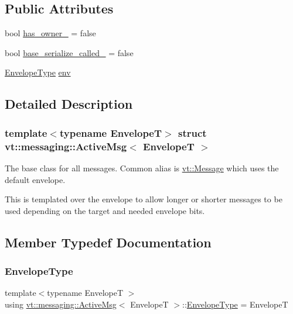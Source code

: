 \subsection*{Public Attributes}
\begin{DoxyCompactItemize}
\item 
bool \hyperlink{structvt_1_1messaging_1_1_active_msg_a8cdaa2d7bbf2529831a6e7434132d385}{has\+\_\+owner\+\_\+} = false
\item 
bool \hyperlink{structvt_1_1messaging_1_1_active_msg_a853a59ae8106507e216809c828fdc7f2}{base\+\_\+serialize\+\_\+called\+\_\+} = false
\item 
\hyperlink{structvt_1_1messaging_1_1_active_msg_a6e2b0541c25f7290555bf50d7cc05874}{Envelope\+Type} \hyperlink{structvt_1_1messaging_1_1_active_msg_ae3f8937b2c95f548f1a3c3340b887c09}{env}
\end{DoxyCompactItemize}


\subsection{Detailed Description}
\subsubsection*{template$<$typename EnvelopeT$>$\newline
struct vt\+::messaging\+::\+Active\+Msg$<$ Envelope\+T $>$}

The base class for all messages. Common alias is {\ttfamily \hyperlink{namespacevt_a3a3ddfef40b4c90915fa43cdd5f129ea}{vt\+::\+Message}} which uses the default envelope. 

This is templated over the envelope to allow longer or shorter messages to be used depending on the target and needed envelope bits. 

\subsection{Member Typedef Documentation}
\mbox{\label{structvt_1_1messaging_1_1_active_msg_a6e2b0541c25f7290555bf50d7cc05874}} 
\subsubsection{\texorpdfstring{Envelope\+Type}{EnvelopeType}}
{\footnotesize\ttfamily template$<$typename EnvelopeT $>$ \\
using \hyperlink{structvt_1_1messaging_1_1_active_msg}{vt\+::messaging\+::\+Active\+Msg}$<$ EnvelopeT $>$\+::\hyperlink{structvt_1_1messaging_1_1_active_msg_a6e2b0541c25f7290555bf50d7cc05874}{Envelope\+Type} =  EnvelopeT}

